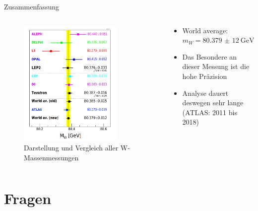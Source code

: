 \documentclass[aspectratio=1610, 9pt]{beamer}
\begin{document}
\begin{frame}{Zusammenfassung}
  \begin{columns}
    \begin{column}{0.4\textwidth}
      \begin{figure}
        \includegraphics[width=0.8\textwidth]{images/comparison2.png}
        \caption{Darstellung und Vergleich aller W-Massenmessungen \cite{comparison2}}
      \end{figure}
    \end{column}
    \begin{column}{0.4\textwidth}
      \begin{itemize}
        \item World average: $m_W = \SI{80,379(12)}{\GeV}$
        \item Das Besondere an dieser Messung ist die hohe Präzision
        \item Analyse dauert deswegen sehr lange (ATLAS: 2011 bis 2018)
      \end{itemize}
    \end{column}
  \end{columns}
\end{frame}

\section{Fragen}
\end{document}
